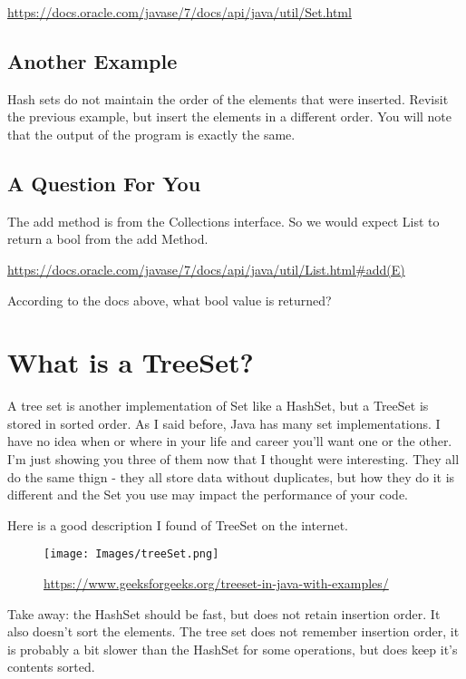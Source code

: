 \documentclass[12pt]{article}
\begin{document}
\url{https://docs.oracle.com/javase/7/docs/api/java/util/Set.html}



\subsection{Another Example}
Hash sets do not maintain the order of the elements that were inserted. Revisit the previous example, but insert the elements in a different order. You will note that the output of the program is exactly the same.


\subsection{A Question For You}
The add method is from the Collections interface. So we would expect List to return a bool from the add Method.

\url{https://docs.oracle.com/javase/7/docs/api/java/util/List.html#add(E)}

According to the docs above, what bool value is returned?

\section{What is a TreeSet?}
A tree set is another implementation of Set like a HashSet, but a TreeSet is stored in sorted order. As I said before, Java has many set implementations. I have no idea when or where in your life and career you'll want one or the other. I'm just showing you three of them now that I thought were interesting. They all do the same thign - they all store data without duplicates, but how they do it is different and the Set you use may impact the performance of your code.

Here is a good description I found of TreeSet on the internet.

\begin{figure}[h]
  \centering
    \texttt{[image: Images/treeSet.png]}
  \caption{\url{https://www.geeksforgeeks.org/treeset-in-java-with-examples/}}
\end{figure}

Take away: the HashSet should be fast, but does not retain insertion order. It also doesn't sort the elements. The tree set does not remember insertion order, it is probably a bit slower than the HashSet for some operations, but does keep it's contents sorted.
\end{document}
